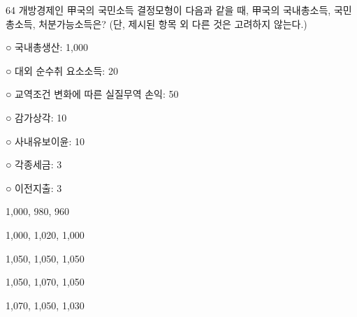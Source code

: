 \begin{question}{64}
개방경제인 甲국의 국민소득 결정모형이 다음과 같을 때, 甲국의 국내총소득, 국민총소득, 처분가능소득은? (단, 제시된 항목 외 다른 것은 고려하지 않는다.)
\begin{framedtext}
○ 국내총생산: 1,000 \par
○ 대외 순수취 요소소득: 20 \par
○ 교역조건 변화에 따른 실질무역 손익: 50 \par
○ 감가상각: 10 \par
○ 사내유보이윤: 10 \par
○ 각종세금: 3 \par
○ 이전지출: 3
\end{framedtext}
\begin{choices}
  \item 1,000, 980, 960
  \item 1,000, 1,020, 1,000
  \item 1,050, 1,050, 1,050
  \item 1,050, 1,070, 1,050
  \item 1,070, 1,050, 1,030
\end{choices}
\end{question}
